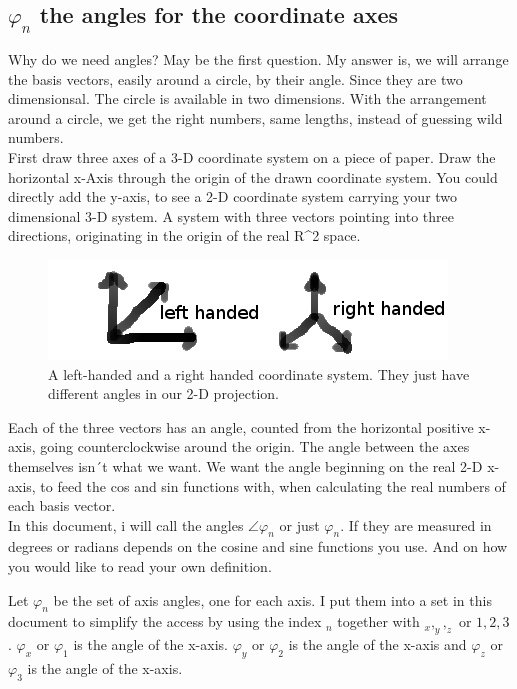 \documentclass[a4paper]{article}
\begin{document}
\subsection{$\varphi_n$ the angles for the coordinate axes}

Why do we need angles? May be the first question. My answer is, we will arrange the basis vectors,
easily around a circle, by their angle. Since they are two dimensionsal. The circle is available in two dimensions.
With the arrangement around a circle, we get the right numbers, same lengths, instead of guessing wild numbers.\\

First draw three axes of a 3-D coordinate system on a piece of paper. Draw the horizontal x-Axis through the origin of the drawn coordinate system. You could directly add the y-axis, to see a 2-D coordinate system carrying your two dimensional 3-D system. A system with three vectors pointing into three directions, originating in the origin of the real R^2 space.\\

\begin{figure}[ht]
\includegraphics{handsystems.png}
\caption{A left-handed and a right handed coordinate system. They just have different angles in our 2-D projection.}
\end{figure}

Each of the three vectors has an angle, counted from the horizontal positive x-axis, going counterclockwise around the origin. The
angle between the axes themselves isn´t what we want. We want the angle beginning on the real 2-D x-axis, to feed the cos and sin functions with, when calculating the real numbers of each basis vector.\\

In this document, i will call the angles $\angle \varphi_n$ or just $\varphi_n$. If they are measured in degrees or radians depends
on the cosine and sine functions you use. And on how you would like to read your own definition.

Let $\varphi_n$ be the set of axis angles, one for each axis. I put them into a set in this document to simplify the access by
using the index $_n$ together with $_x, _y, _z$ or $1,2,3$. $\varphi_x$ or $\varphi_1$ is the angle of the x-axis. $\varphi_y$ or $\varphi_2$ is the angle of the x-axis and $\varphi_z$ or $\varphi_3$ is the angle of the x-axis. 
\end{document}
